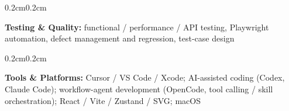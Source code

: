 \documentclass[10pt, a4paper]{article}
\newenvironment{onecolentry}{
    \begin{adjustwidth}{0.2cm}{0.2cm}
}{
    \end{adjustwidth}
}
\begin{document}
\vspace{0.06cm}

    \begin{onecolentry}
        \textbf{Testing \& Quality:} functional / performance / API testing, Playwright automation, defect management and regression, test-case design
    \end{onecolentry}

\vspace{0.06cm}

    \begin{onecolentry}
        \textbf{Tools \& Platforms:} Cursor / VS Code / Xcode; AI-assisted coding (Codex, Claude Code); workflow-agent development (OpenCode, tool calling / skill orchestration); React / Vite / Zustand / SVG; macOS
    \end{onecolentry}

\endgroup
\end{document}
